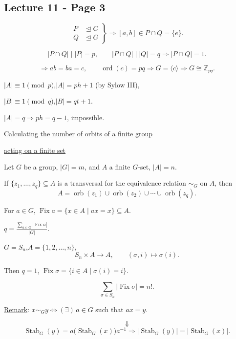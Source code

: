 
\subsection*{Lecture 11 - Page 3}

\[
\left.\begin{aligned}
P &\trianglelefteq G\\
Q &\trianglelefteq G
\end{aligned}\right\}
\Longrightarrow [a,b]\in P\cap Q=\{e\}.
\]

\[
|P\cap Q|\mid |P|=p,\qquad
|P\cap Q|\mid |Q|=q
\Longrightarrow |P\cap Q|=1.
\]

\[
\Longrightarrow ab=ba=c,\qquad
\operatorname{ord}(c)=pq
\Longrightarrow G=\langle c\rangle
\Longrightarrow G\cong\mathbb{Z}_{pq}.
\]

\bigskip
\noindent $|A|\equiv1\pmod p$,\qquad $|A|=ph+1$ \quad (by Sylow III),

\noindent $|B|\equiv1\pmod q$,\qquad $|B|=qt+1$.

\medskip
\noindent $|A|=q\Longrightarrow ph=q-1$, impossible.

\bigskip
\noindent\underline{Calculating the number of orbits of a finite group}

\noindent\underline{acting on a finite set}

\medskip
\noindent Let $G$ be a group, $|G|=m$, and $A$ a finite $G$-set, $|A|=n$.

\medskip
\noindent If $\{z_1,\ldots,z_q\}\subseteq A$ is a transversal for the
 equivalence relation $\sim_G$ on $A$, then
\[
A=\operatorname{orb}(z_1)\cup\operatorname{orb}(z_2)
\cup\cdots\cup\operatorname{orb}(z_q).
\]

\noindent For $a\in G$, $\operatorname{Fix}a=\{x\in A\mid ax=x\}\subseteq A$.

\medskip
\noindent{}
\qquad
\(\displaystyle q=\frac{\sum_{a\in G}|\operatorname{Fix}a|}{|G|}.\)

\bigskip
\noindent $G=S_n$,\qquad $A=\{1,2,\ldots,n\}$,
\[
S_n\times A\longrightarrow A,\qquad (\sigma,i)\longmapsto\sigma(i).
\]

\noindent Then $q=1$,\quad
$\operatorname{Fix}\sigma=\{i\in A\mid\sigma(i)=i\}$.

\[
\sum_{\sigma\in S_n}|\operatorname{Fix}\sigma|=n!.
\]

\bigskip
\noindent\underline{Remark}: $x\sim_G y\Longleftrightarrow
(\exists)\,a\in G$ such that $ax=y$.

\[
\Downarrow
\]
\[
\operatorname{Stab}_G(y)=a\bigl(\operatorname{Stab}_G(x)\bigr)a^{-1}
\Longrightarrow
|\operatorname{Stab}_G(y)|=|\operatorname{Stab}_G(x)|.
\]
